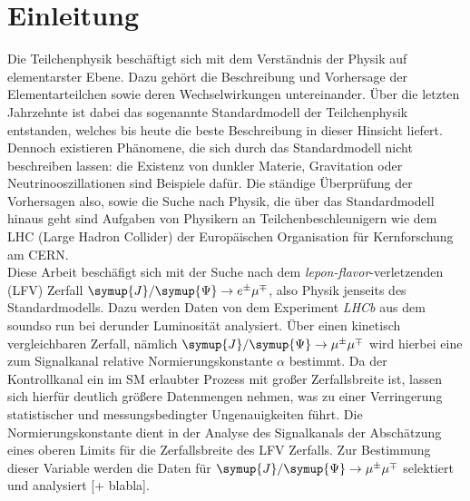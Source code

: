 \chapter{Einleitung}

Die Teilchenphysik beschäftigt sich mit dem Verständnis der Physik auf elementarster Ebene. Dazu gehört die Beschreibung und Vorhersage der Elementarteilchen sowie deren Wechselwirkungen untereinander. Über die letzten Jahrzehnte ist dabei das sogenannte Standardmodell der Teilchenphysik entstanden, welches bis heute die beste Beschreibung in dieser Hinsicht liefert. Dennoch existieren Phänomene, die sich durch das Standardmodell nicht beschreiben lassen: die Existenz von dunkler Materie, Gravitation oder Neutrinooszillationen sind Beispiele dafür. Die ständige Überprüfung der Vorhersagen also, sowie die Suche nach Physik, die über das Standardmodell hinaus geht sind Aufgaben von Physikern an Teilchenbeschleunigern wie dem LHC (Large Hadron Collider) der Europäischen Organisation für Kernforschung am CERN. \\
Diese Arbeit beschäfigt sich mit der Suche nach dem \textit{lepon-flavor}-verletzenden (LFV) Zerfall $\symup{J}/\symup{\Psi}\rightarrow e^{\pm}\mu^{\mp}$, also Physik jenseits des Standardmodells.
Dazu werden Daten von dem Experiment \textit{LHCb} aus dem soundso run bei derunder Luminosität analysiert. Über einen kinetisch vergleichbaren Zerfall, nämlich $\symup{J}/\symup{\Psi}\rightarrow \mu^{\pm}\mu^{\mp}$ wird hierbei eine zum Signalkanal relative Normierungskonstante $\alpha$ bestimmt. Da der Kontrollkanal ein im SM erlaubter Prozess mit großer Zerfallsbreite ist, lassen sich hierfür deutlich größere Datenmengen nehmen, was zu einer Verringerung statistischer und messungsbedingter Ungenauigkeiten führt. Die Normierungskonstante dient in der Analyse des Signalkanals der Abschätzung eines oberen Limits für die Zerfallsbreite des LFV Zerfalls. Zur Bestimmung dieser Variable werden die Daten für $\symup{J}/\symup{\Psi}\rightarrow \mu^{\pm}\mu^{\mp}$ selektiert und analysiert [+ blabla].
